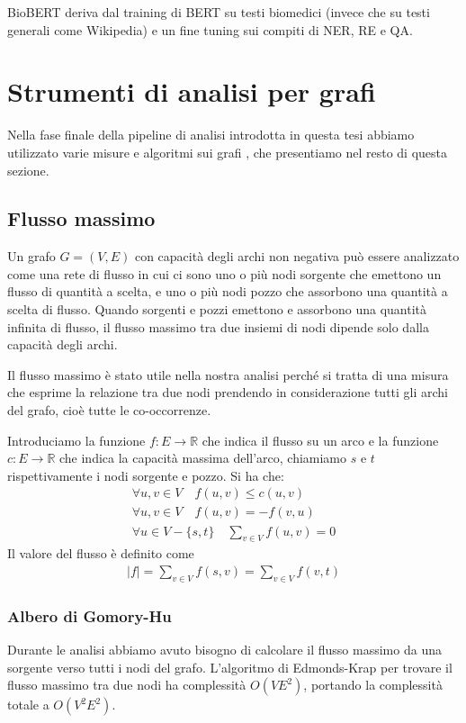 \documentclass[12pt]{report}
\begin{document}
BioBERT \cite{lee2020biobert} deriva dal training di BERT su testi biomedici (invece che su testi generali come Wikipedia) e un fine tuning sui compiti di NER, RE e QA.

\section{Strumenti di analisi per grafi}

Nella fase finale della pipeline di analisi introdotta in questa tesi abbiamo utilizzato varie misure e algoritmi sui grafi \cite{cormen, bigi}, che presentiamo nel resto di questa sezione. 

\subsection{Flusso massimo}

Un grafo $G = (V,E)$ con capacità degli archi non negativa può essere analizzato come una rete di flusso in cui ci sono uno o più nodi sorgente che emettono un flusso di quantità a scelta, e uno o più nodi pozzo che assorbono una quantità a scelta di flusso. Quando sorgenti e pozzi emettono e assorbono una quantità infinita di flusso, il flusso massimo tra due insiemi di nodi dipende solo dalla capacità degli archi.

Il flusso massimo è stato utile nella nostra analisi perché si tratta di una misura che esprime la relazione tra due nodi prendendo in considerazione tutti gli archi del grafo, cioè tutte le co-occorrenze.

Introduciamo la funzione $f: E \rightarrow \mathbb{R}$ che indica il flusso su un arco e la funzione $c: E \rightarrow \mathbb{R}$ che indica la capacità massima dell'arco, chiamiamo $s$ e $t$ rispettivamente i nodi sorgente e pozzo. Si ha che:
\begin{gather}
    \forall u,v \in V \quad f(u,v) \leq c(u,v)\\
    \forall u,v \in V \quad f(u,v) =  -f(v,u)\\
    \forall u \in V - \{s,t\} \quad \sum_{v \in V}f(u,v)= 0
\end{gather}
Il valore del flusso è definito come
\begin{gather}
    |f|= \sum_{v \in V}f(s,v) = \sum_{v \in V}f(v,t)
\end{gather}

\subsubsection{Albero di Gomory-Hu}
Durante le analisi abbiamo avuto bisogno di calcolare il flusso massimo da una sorgente verso tutti i nodi del grafo. L'algoritmo di Edmonds-Krap per trovare il flusso massimo tra due nodi ha complessità $O(VE^2)$, portando la complessità totale a $O(V^2E^2)$.
\end{document}
